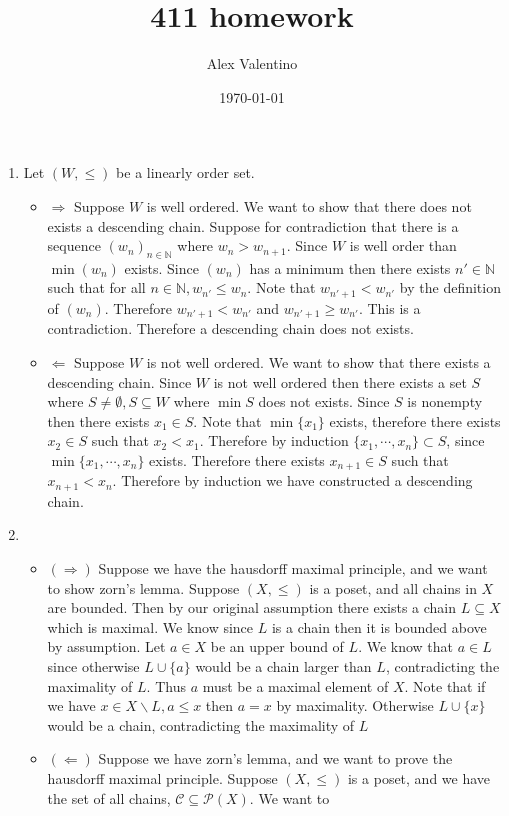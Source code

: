 \documentclass[12pt, letterpaper]{article}
\date{\today}
\author{Alex Valentino}
\title{411 homework}
\newcommand{\N}{\mathbb{N}}
\newcommand{\Po}{\mathcal{P}}
\begin{document}
\begin{enumerate}
	\item Let $(W,\leq)$ be a linearly order set.  
	\begin{itemize}
		\item  $\Rightarrow$ Suppose $W$ is well ordered.  We want to show that there does not 
		exists a descending chain.  Suppose for contradiction that there is a sequence $(w_n)_{n \in \N}$ where $w_n > w_{n+1}$.  Since $W$ is well order than 
		$\min (w_n)$ exists.  Since $(w_n)$ has a minimum then there exists 
		$n' \in \N$ such that for all $n \in \N, w_{n'} \leq w_n$.  Note that 
		$w_{n'+1} < w_{n'}$ by the definition of $(w_n)$.  Therefore $w_{n'+1} < w_{n'}$ and $w_{n'+1} \geq w_{n'}$.  This is a contradiction.  Therefore a descending chain does not exists.  
		\item $\Leftarrow$ Suppose $W$ is not well ordered.  We want to show that there exists 
		a descending chain.  Since $W$ is not well ordered then there exists a set
		$S$ where $S \neq \emptyset, S \subseteq W$ where $\min S$ does not exists.  Since $S$ is nonempty then there exists $x_1 \in S$.  Note that $\min \{x_1\}$ exists, therefore there exists $x_2 \in S$ such that $x_2 < x_1$.  Therefore by induction $\{x_1,\cdots,x_n\} \subset S$, since $\min \{x_1,\cdots,x_n\}$ exists.  Therefore there exists $x_{n+1} \in S$ such that $x_{n+1} < x_n$.  Therefore by induction we have constructed a descending chain.  
	\end{itemize}
	\item 
	\begin{itemize}
		\item $(\Rightarrow)$ Suppose we have the hausdorff maximal principle, and 
		we want to show zorn's lemma.  Suppose $(X,\leq)$ is a poset, and all 
		chains in $X$ are bounded.  Then
		by our original assumption there exists a chain $L \subseteq X$ which is 
		maximal.  We know since $L$ is a chain then it is bounded above by assumption.  Let $a\in X$ be an upper bound of $L$.  We know that $a \in L$ since 
		otherwise $L \cup \{a\}$ would be a chain larger than $L$, contradicting
		the maximality of $L$.  Thus $a$ must be a maximal element of $X$.  
		Note that if we have $x \in X \backslash L, a \leq x$ then $a = x$ by maximality.  Otherwise $L \cup \{x\}$ would be a chain, contradicting the maximality of $L$
		\item $(\Leftarrow)$ Suppose we have zorn's lemma, and we want to prove 
		the hausdorff maximal principle.  Suppose $(X,\leq)$ is a poset, and we 
		have the set of all chains, $\mathcal{C} \subseteq \Po (X)$.  We want to 

\end{itemize}
\end{enumerate}
\end{document}
